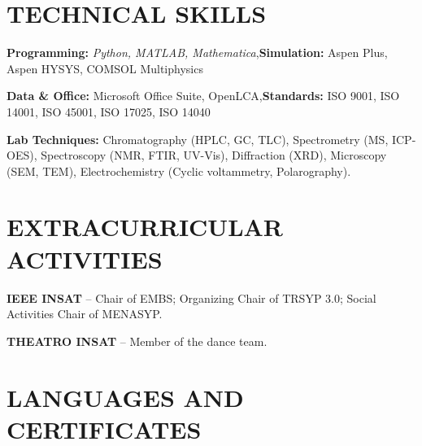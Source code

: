 \documentclass[10pt]{article}
\begin{document}
\section{TECHNICAL SKILLS}
\begin{bul}
\item \textbf{Programming:} \textit{Python, MATLAB, Mathematica}\sep\textbf{Simulation:} Aspen Plus, Aspen HYSYS, COMSOL Multiphysics
\item \textbf{Data \& Office:} Microsoft Office Suite, OpenLCA\sep\textbf{Standards:} ISO 9001, ISO 14001, ISO 45001, ISO 17025, ISO 14040
\item \textbf{Lab Techniques:} Chromatography (HPLC, GC, TLC), Spectrometry (MS, ICP-OES), Spectroscopy (NMR, FTIR, UV-Vis), Diffraction (XRD), Microscopy (SEM, TEM), Electrochemistry (Cyclic voltammetry, Polarography).
\end{bul}

\section{EXTRACURRICULAR ACTIVITIES}
\begin{bul}
\item \textbf{IEEE INSAT} – Chair of EMBS; Organizing Chair of TRSYP 3.0; Social Activities Chair of MENASYP.
\item \textbf{THEATRO INSAT} – Member of the dance team.
\end{bul}

\section{LANGUAGES AND CERTIFICATES}
\end{document}
